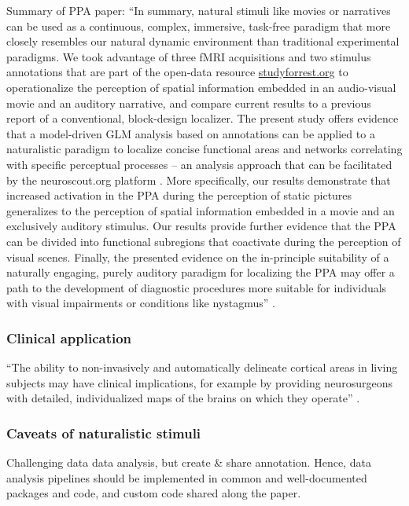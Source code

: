 Summary of PPA paper:
``In summary, natural stimuli like movies \citep{eickhoff2020towards,
hasson2008neurocinematics, sonkusare2019naturalistic} or narratives
\citep{hamilton2018revolution, honey2012not, lerner2011topographic,
silbert2014coupled, wilson2008beyond} can be used as a continuous, complex,
immersive, task-free paradigm that more closely resembles our natural dynamic
environment than traditional experimental paradigms.
We took advantage of three fMRI acquisitions and two stimulus annotations that
are part of the open-data resource
\href{http://www.studyforrest.org}{studyforrest.org} to operationalize the
perception of spatial information embedded in an audio-visual movie and an
auditory narrative, and compare current results to a previous report of a
conventional, block-design localizer.
The present study offers evidence that a model-driven GLM analysis based on
annotations can be applied to a naturalistic paradigm to localize concise
functional areas and networks correlating with specific perceptual processes --
an analysis approach that can be facilitated by the neuroscout.org platform
\citep{delavega2021neuroscout}.
More specifically, our results demonstrate that increased activation in the PPA
during the perception of static pictures generalizes to the perception of
spatial information embedded in a movie and an exclusively auditory stimulus.
Our results provide further evidence that the PPA can be divided into functional
subregions that coactivate during the perception of visual scenes.
Finally, the presented evidence on the in-principle suitability of a naturally
engaging, purely auditory paradigm for localizing the PPA may offer a path to
the development of diagnostic procedures more suitable for individuals with
visual impairments or conditions like nystagmus''
\citep{haeusler2022processing}.


\subsubsection{Clinical application}

%
``The ability to non-invasively and automatically delineate cortical areas in
living subjects may have clinical implications, for example by providing
neurosurgeons with detailed, individualized maps of the brains on which they
operate'' \citep{glasser2016multi}.


\subsubsection{Caveats of naturalistic stimuli}
%
Challenging data data analysis, but create \& share annotation.
%
Hence, data analysis pipelines should be implemented in common and
well-documented packages and code, and custom code shared along the paper.

